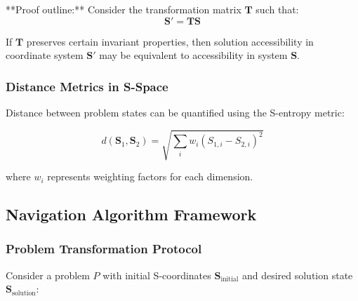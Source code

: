 \documentclass[11pt]{article}
\begin{document}
**Proof outline:** Consider the transformation matrix $\mathbf{T}$ such that:
\begin{equation}
\mathbf{S}' = \mathbf{T} \mathbf{S}
\label{eq:coordinate_transformation}
\end{equation}

If $\mathbf{T}$ preserves certain invariant properties, then solution accessibility in coordinate system $\mathbf{S}'$ may be equivalent to accessibility in system $\mathbf{S}$.

\subsubsection{Distance Metrics in S-Space}

Distance between problem states can be quantified using the S-entropy metric:

\begin{equation}
d(\mathbf{S}_1, \mathbf{S}_2) = \sqrt{\sum_{i} w_i (S_{1,i} - S_{2,i})^2}
\label{eq:s_entropy_distance}
\end{equation}

where $w_i$ represents weighting factors for each dimension.

\subsection{Navigation Algorithm Framework}

\subsubsection{Problem Transformation Protocol}

Consider a problem $P$ with initial S-coordinates $\mathbf{S}_{\text{initial}}$ and desired solution state $\mathbf{S}_{\text{solution}}$:
\end{document}
